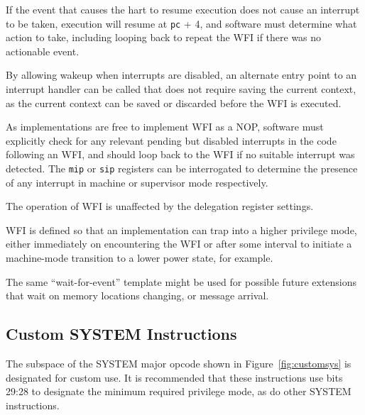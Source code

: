 If the event that causes the hart to resume execution does not cause
an interrupt to be taken, execution will resume at {\tt pc} + 4, and
software must determine what action to take, including looping back to
repeat the WFI if there was no actionable event.

\begin{commentary}
By allowing wakeup when interrupts are disabled, an alternate entry
point to an interrupt handler can be called that does not require
saving the current context, as the current context can be saved or
discarded before the WFI is executed.

As implementations are free to implement WFI as a NOP, software must
explicitly check for any relevant pending but disabled interrupts in
the code following an WFI, and should loop back to the WFI if no
suitable interrupt was detected.  The {\tt mip} or {\tt sip}
registers can be interrogated to determine the presence
of any interrupt in machine or supervisor mode
respectively.

The operation of WFI is unaffected by the delegation register settings.

WFI is defined so that an implementation can trap into a higher
privilege mode, either immediately on encountering the WFI or after
some interval to initiate a machine-mode transition to a lower power
state, for example.
\end{commentary}

\begin{commentary}
The same ``wait-for-event'' template might be used for possible future
extensions that wait on memory locations changing, or message
arrival.
\end{commentary}

\subsection{Custom SYSTEM Instructions}
\label{sec:customsys}

The subspace of the SYSTEM major opcode shown in Figure~\ref{fig:customsys}
is designated for custom use.
It is recommended that these instructions use bits 29:28 to designate the
minimum required privilege mode, as do other SYSTEM instructions.

